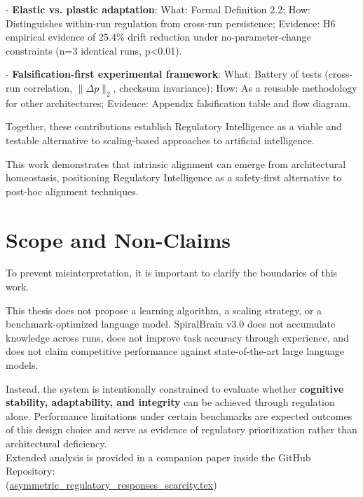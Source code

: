 \documentclass[12pt,a4paper]{report}
\begin{document}
- \textbf{Elastic vs. plastic adaptation}: What: Formal Definition 2.2; How: Distinguishes within-run regulation from cross-run persistence; Evidence: H6 empirical evidence of 25.4\% drift reduction under no-parameter-change constraints (n=3 identical runs, p<0.01).

- \textbf{Falsification-first experimental framework}: What: Battery of tests (cross-run correlation, \(\|\Delta p\|_2\), checksum invariance); How: As a reusable methodology for other architectures; Evidence: Appendix falsification table and flow diagram.

Together, these contributions establish Regulatory Intelligence as a viable and testable alternative to scaling-based approaches to artificial intelligence.

This work demonstrates that intrinsic alignment can emerge from architectural homeostasis, positioning Regulatory Intelligence as a safety-first alternative to post-hoc alignment techniques.

\pagebreak

\section{Scope and Non-Claims}

To prevent misinterpretation, it is important to clarify the boundaries of this work.

This thesis does not propose a learning algorithm, a scaling strategy, or a benchmark-optimized language model. SpiralBrain v3.0 does not accumulate knowledge across runs, does not improve task accuracy through experience, and does not claim competitive performance against state-of-the-art large language models.

Instead, the system is intentionally constrained to evaluate whether \textbf{cognitive stability, adaptability, and integrity} can be achieved through regulation alone. Performance limitations under certain benchmarks are expected outcomes of this design choice and serve as evidence of regulatory prioritization rather than architectural deficiency. \\

Extended analysis is provided in a companion paper inside the GitHub Repository: \\
{\small (\href{https://github.com/jhcragin/SpiralBrain-v3.0-public/blob/main/papers/asymmetric_regulatory_responses_scarcity/asymmetric_regulatory_responses_scarcity.tex}{asymmetric\_regulatory\_responses\_scarcity.tex})}
\end{document}
